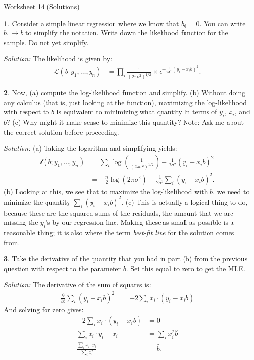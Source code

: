 \documentclass{tufte-handout}
\begin{document}
\justify

{\LARGE Worksheet 14 (Solutions)}

\vspace*{18pt}


\textbf{1}. Consider a simple linear regression where we know that $b_0 = 0$. You can write
$b_1 \rightarrow b$ to simplify the notation. Write down the likelihood function
for the sample. Do not yet simplify.

\textit{Solution:} The likelihood is given by:
\begin{align*}
\mathcal{L}(b; y_1, \ldots, y_n) &= 
\prod_i \frac{1}{(2 \pi \sigma^2)^{1/2}} \times e^{-\frac{1}{2\sigma^2}(y_i - x_i b)^2}.
\end{align*}

\textbf{2}. Now, (a) compute the log-likelihood function and simplify. (b) Without doing any
calculus (that is, just looking at the function), maximizing the log-likelihood
with respect to $b$ is equivalent to minimizing what quantity in terms of $y_i$,
$x_i$, and $b$? (c) Why might it make sense to minimize this quantity?
Note: Ask me about the correct solution before proceeding. 

\textit{Solution:} (a) Taking the logarithm and simplifying yields:
\begin{align*}
\mathcal{l}(b; y_1, \ldots, y_n) &= 
\sum_i \log\left(\frac{1}{(2 \pi \sigma^2)^{1/2}}\right) - \frac{1}{2\sigma^2}(y_i - x_i b)^2 \\
&=  -\frac{n}{2}\log(2 \pi \sigma^2) - \frac{1}{2\sigma^2} \sum_i (y_i - x_i b)^2.
\end{align*}
(b) Looking at this, we see that to maximize the log-likelihood with $b$, we need
to minimize the quantity $\sum_i (y_i - x_i b)^2$. (c) This is actually a logical
thing to do, because these are the squared sums of the residuals, the amount that
we are missing the $y_i$'s by our regression line. Making these as small as 
possible is a reasonable thing; it is also where the term \textit{best-fit line}
for the solution comes from.

\textbf{3}. Take the derivative of the quantity that you had in part (b) from the previous
question with respect to the parameter $b$. Set this equal to zero to get the 
MLE.

\textit{Solution:} The derivative of the sum of squares is:
\begin{align*}
\frac{\partial}{\partial b} \sum_i (y_i - x_i b)^2 &= -2 \sum_i x_i \cdot (y_i - x_i b)
\end{align*}
And solving for zero gives:
\begin{align*}
-2 \sum_i x_i \cdot (y_i - x_i b) &= 0\\
\sum_i x_i \cdot y_i - x_i &= \sum_i x_i^2 \widehat{b} \\
\frac{\sum_i x_i \cdot y_i}{\sum_i x_i^2} &= \widehat{b}.
\end{align*}
\end{document}
